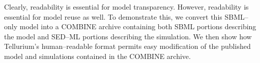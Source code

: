 \documentclass[10pt,letterpaper]{article}
\begin{document}
Clearly, readability is essential for model transparency. However, readability is essential for model reuse as well. To demonstrate this, we convert this SBML--only model into a COMBINE archive containing both SBML portions describing the model and SED--ML portions describing the simulation.  We then show how Tellurium's human--readable format permits easy modification of the published model and simulations contained in the COMBINE archive.


\end{document}
